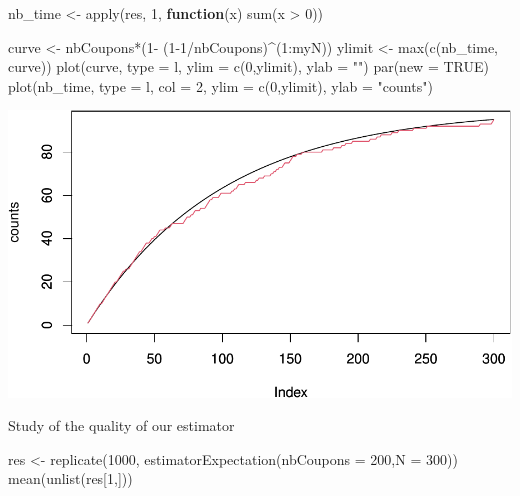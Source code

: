 \documentclass[
]{article}
\newenvironment{Shaded}{\begin{snugshade}}{\end{snugshade}}
\newcommand{\AttributeTok}[1]{\textcolor[rgb]{0.77,0.63,0.00}{#1}}
\newcommand{\ConstantTok}[1]{\textcolor[rgb]{0.00,0.00,0.00}{#1}}
\newcommand{\ControlFlowTok}[1]{\textcolor[rgb]{0.13,0.29,0.53}{\textbf{#1}}}
\newcommand{\DecValTok}[1]{\textcolor[rgb]{0.00,0.00,0.81}{#1}}
\newcommand{\FunctionTok}[1]{\textcolor[rgb]{0.00,0.00,0.00}{#1}}
\newcommand{\NormalTok}[1]{#1}
\newcommand{\OtherTok}[1]{\textcolor[rgb]{0.56,0.35,0.01}{#1}}
\newcommand{\SpecialCharTok}[1]{\textcolor[rgb]{0.00,0.00,0.00}{#1}}
\newcommand{\StringTok}[1]{\textcolor[rgb]{0.31,0.60,0.02}{#1}}
\begin{document}
\begin{Shaded}
\begin{Highlighting}[]
\NormalTok{nb\_time }\OtherTok{\textless{}{-}} \FunctionTok{apply}\NormalTok{(res, }\DecValTok{1}\NormalTok{, }\ControlFlowTok{function}\NormalTok{(x) }\FunctionTok{sum}\NormalTok{(x }\SpecialCharTok{\textgreater{}} \DecValTok{0}\NormalTok{))}

\NormalTok{curve }\OtherTok{\textless{}{-}}\NormalTok{ nbCoupons}\SpecialCharTok{*}\NormalTok{(}\DecValTok{1}\SpecialCharTok{{-}}\NormalTok{ (}\DecValTok{1{-}1}\SpecialCharTok{/}\NormalTok{nbCoupons)}\SpecialCharTok{\^{}}\NormalTok{(}\DecValTok{1}\SpecialCharTok{:}\NormalTok{myN))}
\NormalTok{ylimit }\OtherTok{\textless{}{-}} \FunctionTok{max}\NormalTok{(}\FunctionTok{c}\NormalTok{(nb\_time, curve))}
\FunctionTok{plot}\NormalTok{(curve, }\AttributeTok{type =} \StringTok{\textquotesingle{}l\textquotesingle{}}\NormalTok{, }\AttributeTok{ylim =} \FunctionTok{c}\NormalTok{(}\DecValTok{0}\NormalTok{,ylimit), }\AttributeTok{ylab =} \StringTok{""}\NormalTok{)}
\FunctionTok{par}\NormalTok{(}\AttributeTok{new =} \ConstantTok{TRUE}\NormalTok{)}
\FunctionTok{plot}\NormalTok{(nb\_time, }\AttributeTok{type =} \StringTok{\textquotesingle{}l\textquotesingle{}}\NormalTok{, }\AttributeTok{col =} \DecValTok{2}\NormalTok{, }\AttributeTok{ylim =} \FunctionTok{c}\NormalTok{(}\DecValTok{0}\NormalTok{,ylimit), }\AttributeTok{ylab =} \StringTok{"counts"}\NormalTok{)}
\end{Highlighting}
\end{Shaded}

\includegraphics{examples_files/figure-latex/unnamed-chunk-6-2.pdf}

Study of the quality of our estimator

\begin{Shaded}
\begin{Highlighting}[]
\NormalTok{res }\OtherTok{\textless{}{-}} \FunctionTok{replicate}\NormalTok{(}\DecValTok{1000}\NormalTok{, }\FunctionTok{estimatorExpectation}\NormalTok{(}\AttributeTok{nbCoupons =} \DecValTok{200}\NormalTok{,}\AttributeTok{N =} \DecValTok{300}\NormalTok{))}
\FunctionTok{mean}\NormalTok{(}\FunctionTok{unlist}\NormalTok{(res[}\DecValTok{1}\NormalTok{,]))}
\end{Highlighting}
\end{Shaded}
\end{document}
